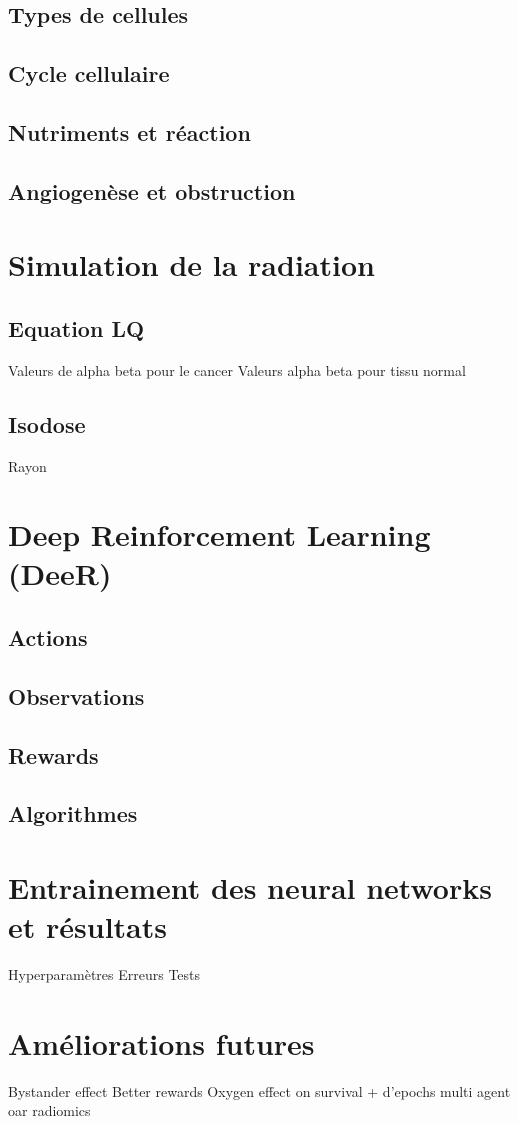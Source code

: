 \documentclass[12pt]{article}
\begin{document}
\subsection{Types de cellules}
\subsection{Cycle cellulaire}
\subsection{Nutriments et réaction}
\subsection{Angiogenèse et obstruction}


\section{Simulation de la radiation}
\subsection{Equation LQ}
Valeurs de alpha beta pour le cancer
Valeurs alpha beta pour tissu normal
\subsection{Isodose}
Rayon

\section{Deep Reinforcement Learning (DeeR)}
\subsection{Actions}
\subsection{Observations}
\subsection{Rewards}
\subsection{Algorithmes}

\section{Entrainement des neural networks et résultats}
Hyperparamètres
Erreurs
Tests

\section{Améliorations futures}
Bystander effect
Better rewards
Oxygen effect on survival
+ d'epochs
multi agent
oar
radiomics



\end{document}
